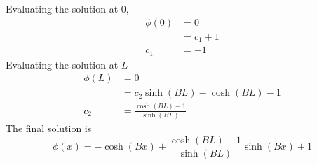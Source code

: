   Evaluating the solution at 0, 
  \begin{align}
    \phi(0) &= 0 \\
    &= c_1 + 1\\
    c_1 &= -1
  \end{align}
  Evaluating the solution at $L$
  \begin{align}
    \phi(L) &= 0\\
    &= c_2 \sinh(BL) - \cosh(BL)-1\\
    c_2 &= \frac{\cosh(BL)-1}{\sinh(BL)}
  \end{align}
  The final solution is 
  \begin{equation} \label{eq:one_dimension}
    \phi(x) = -\cosh(Bx) + \frac{\cosh(BL)-1}{\sinh(BL)} \sinh(Bx) +1
  \end{equation}
  
